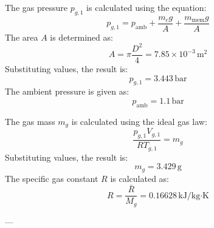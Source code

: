 The gas pressure \( p_{g,1} \) is calculated using the equation:  
\[
p_{g,1} = p_{\text{amb}} + \frac{m_c g}{A} + \frac{m_{\text{mem}} g}{A}
\]  
The area \( A \) is determined as:  
\[
A = \pi \frac{D^2}{4} = 7.85 \times 10^{-3} \, \text{m}^2
\]  
Substituting values, the result is:  
\[
p_{g,1} = 3.443 \, \text{bar}
\]  
The ambient pressure is given as:  
\[
p_{\text{amb}} = 1.1 \, \text{bar}
\]  

The gas mass \( m_g \) is calculated using the ideal gas law:  
\[
\frac{p_{g,1} V_{g,1}}{R T_{g,1}} = m_g
\]  
Substituting values, the result is:  
\[
m_g = 3.429 \, \text{g}
\]  
The specific gas constant \( R \) is calculated as:  
\[
R = \frac{\bar{R}}{M_g} = 0.16628 \, \text{kJ/kg·K}
\]  

---